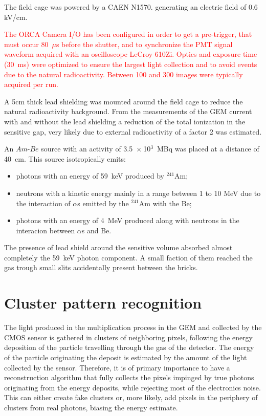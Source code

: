 \documentclass[12pt]{iopart}
\begin{document}
The field cage was powered by a CAEN N1570.\cite{CAENN1570} generating an electric field  of 0.6 kV/cm. 


\textcolor{red}{The ORCA Camera I/O has been configured in order to get a pre-trigger, that must occur 80~$\mu$s before the shutter, and to synchronize the PMT signal waveform acquired with an oscilloscope LeCroy 610Zi. Optics and exposure time (30~ms) were optimized to ensure the largest light collection and to avoid events due to the natural radioactivity. Between 100 and 300 images were typically acquired per run. }

A  5cm thick lead shielding was mounted around the \lemon field cage to reduce the natural radioactivity background. From the measurements of the GEM current with and without the lead shielding a reduction of the total ionization in the sensitive gap, very likely due to external radioactivity of a factor 2 was estimated.

 An $Am$-$Be$ source with an activity of 3.5~$\times~$10$^3$~MBq was placed at a distance of 40~cm. This source isotropically emits:
 \begin{itemize}
     \item photons with an energy of 59~keV produced by $^{241}$Am;
     \item neutrons with a kinetic energy mainly in a range between 1 to 10 MeV due to the interaction of $\alpha$s emitted by the $^{241}$Am with the Be;
     \item photons with an energy of 4~MeV produced along with neutrons in the interacion between $\alpha$s and Be.
 \end{itemize}
 
The presence of lead shield around the sensitive volume absorbed almost completely the 59~keV photon component. A small faction of them reached the gas trough small slits accidentally present between the bricks.
 

\clearpage
 
\section{Cluster pattern recognition}
\label{sec:clustering}
The light produced in the multiplication process in the GEM and
collected by the CMOS sensor is gathered in clusters of neighboring
pixels, following the energy deposition of the particle travelling
through the gas of the detector. The energy of the particle
originating the deposit is estimated by the amount of the light
collected by the sensor.  Therefore, it is of primary importance to
have a reconstruction algorithm that fully collects the pixels
impinged by true photons originating from the energy deposits, while
rejecting most of the electronics noise. This can either create fake
clusters or, more likely, add pixels in the periphery of clusters from
real photons, biasing the energy estimate.
\end{document}
